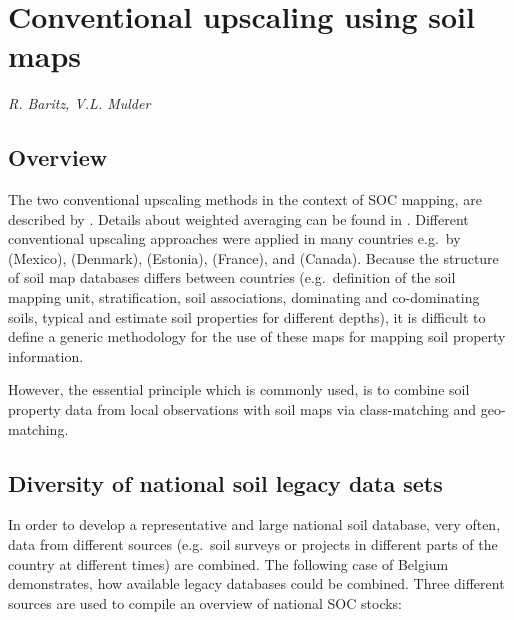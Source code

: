 \documentclass[10pt,b5paper,]{book}
\theoremstyle{definition}
\theoremstyle{definition}
\theoremstyle{definition}
\theoremstyle{remark}
\begin{document}
\hypertarget{convUpscaling}{%
\section{Conventional upscaling using soil maps}\label{convUpscaling}}

\emph{R. Baritz, V.L. Mulder}

\hypertarget{overview}{%
\subsection{Overview}\label{overview}}

The two conventional upscaling methods in the context of SOC mapping,
are described by \citet{lettens2004soil}. Details about weighted
averaging can be found in \citet{hiederer2013mapping}. Different
conventional upscaling approaches were applied in many countries e.g.~by
\citet{krasilnikov2013soils} (Mexico), \citet{greve2007generating}
(Denmark), \citet{kolli2009stocks} (Estonia), \citet{arrouays2001carbon}
(France), and \citet{bhatti2002estimates} (Canada). Because the
structure of soil map databases differs between countries
(e.g.~definition of the soil mapping unit, stratification, soil
associations, dominating and co-dominating soils, typical and estimate
soil properties for different depths), it is difficult to define a
generic methodology for the use of these maps for mapping soil property
information.

However, the essential principle which is commonly used, is to combine
soil property data from local observations with soil maps via
class-matching and geo-matching.

\hypertarget{diversity-of-national-soil-legacy-data-sets}{%
\subsection{Diversity of national soil legacy data
sets}\label{diversity-of-national-soil-legacy-data-sets}}

In order to develop a representative and large national soil database,
very often, data from different sources (e.g.~soil surveys or projects
in different parts of the country at different times) are combined. The
following case of Belgium demonstrates, how available legacy databases
could be combined. Three different sources are used to compile an
overview of national SOC stocks:
\end{document}
